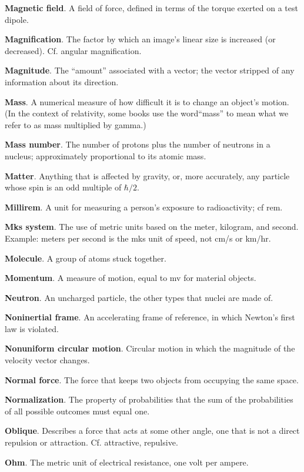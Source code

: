 \textbf{Magnetic field}. A field of force, defined in terms of the torque exerted on a test dipole. 

\textbf{Magnification}. The factor by which an image's linear size is increased (or decreased). Cf. angular
magnification. 

\textbf{Magnitude}. The ``amount'' associated with a vector; the vector stripped of any information about its
direction. 

\textbf{Mass}. A numerical measure of how difficult it is to change an object's motion. (In the context of
relativity, some books use the word``mass'' to mean what we refer to as mass multiplied by gamma.)

\textbf{Mass number}. The number of protons plus the number of neutrons in a nucleus; approximately
proportional to its atomic mass. 

\textbf{Matter}. Anything that is affected by gravity, or, more accurately, any particle whose spin is
an odd multiple of $\hbar/2$.

\textbf{Millirem}. A unit for measuring a person's exposure to radioactivity; cf rem. 

\textbf{Mks system}. The use of metric units based on the meter, kilogram, and second. Example: meters per
second is the
mks unit of speed, not cm/s or km/hr. 

\textbf{Molecule}. A group of atoms stuck together. 

\textbf{Momentum}. A measure of motion, equal to mv for material objects. 

\textbf{Neutron}. An uncharged particle, the other types that nuclei are made of. 

\textbf{Noninertial frame}. An accelerating frame of reference, in which Newton's first law is violated. 

\textbf{Nonuniform circular motion}. Circular motion in which the magnitude of the velocity vector changes. 

\textbf{Normal force}. The force that keeps two objects from occupying the same space.

\textbf{Normalization}. The property of probabilities that the sum of the probabilities of all possible
outcomes must equal one.

\textbf{Oblique}. Describes a force that acts at some other angle, one that is not a direct repulsion or
attraction. Cf.
attractive, repulsive. 

\textbf{Ohm}. The metric unit of electrical resistance, one volt per ampere. 

